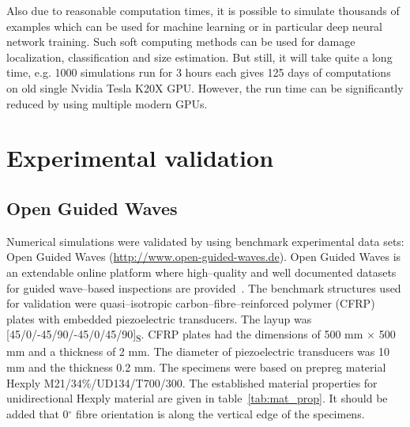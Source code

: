 \documentclass[12pt]{iopart}
\begin{document}
Also due to reasonable computation times, it is possible to simulate thousands of examples which can be used for machine learning or in particular deep neural network training. Such soft computing methods can be used for damage localization, classification and size estimation. But still, it will take quite a long time, e.g. 1000 simulations run for 3 hours each gives 125 days of computations on old single Nvidia Tesla K20X GPU. However, the run time can be significantly reduced by using multiple modern GPUs.

\section{Experimental validation}
\subsection{Open Guided Waves \label{sec:ogw}}
Numerical simulations were validated by using benchmark experimental data sets: Open Guided Waves (\url{http://www.open-guided-waves.de}). Open Guided Waves is an extendable online platform where high--quality and well documented datasets for guided wave--based inspections are provided~\cite{Moll2018}. The benchmark structures used for validation were quasi--isotropic carbon--fibre--reinforced polymer (CFRP) plates with embedded piezoelectric transducers. The layup was [45/0/-45/90/-45/0/45/90]\textsubscript{S}. CFRP plates had the dimensions of 500 mm \(\times\) 500 mm and a thickness of 2 mm. The diameter of piezoelectric transducers was 10 mm and the thickness 0.2 mm. The specimens were based on prepreg material Hexply\textsuperscript{\textregistered} M21/34\%/UD134/T700/300. The established material properties for unidirectional Hexply material are given in table~\ref{tab:mat_prop}. It should be added that 0\(^{\circ}\) fibre orientation is along the vertical edge of the specimens.
\end{document}
